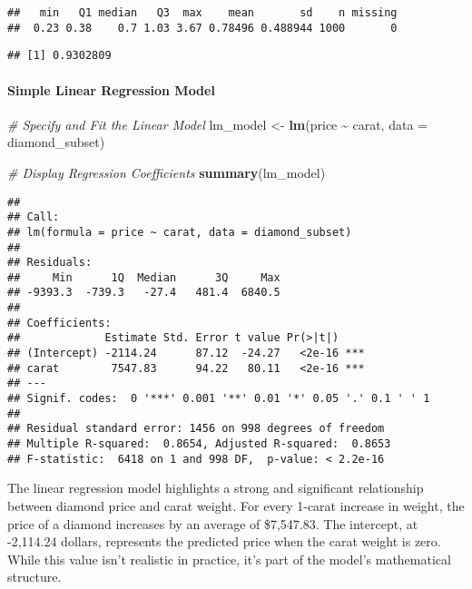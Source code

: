 \documentclass[
]{article}
\newenvironment{Shaded}{\begin{snugshade}}{\end{snugshade}}
\newcommand{\AttributeTok}[1]{\textcolor[rgb]{0.13,0.29,0.53}{#1}}
\newcommand{\CommentTok}[1]{\textcolor[rgb]{0.56,0.35,0.01}{\textit{#1}}}
\newcommand{\FunctionTok}[1]{\textcolor[rgb]{0.13,0.29,0.53}{\textbf{#1}}}
\newcommand{\NormalTok}[1]{#1}
\newcommand{\OtherTok}[1]{\textcolor[rgb]{0.56,0.35,0.01}{#1}}
\newcommand{\SpecialCharTok}[1]{\textcolor[rgb]{0.81,0.36,0.00}{\textbf{#1}}}
\begin{document}
\begin{verbatim}
##   min   Q1 median   Q3  max    mean       sd    n missing
##  0.23 0.38    0.7 1.03 3.67 0.78496 0.488944 1000       0
\end{verbatim}

\begin{Shaded}
\end{Shaded}

\begin{verbatim}
## [1] 0.9302809
\end{verbatim}

\paragraph{Simple Linear Regression
Model}\label{simple-linear-regression-model}

\begin{Shaded}
\begin{Highlighting}[]
\CommentTok{\# Specify and Fit the Linear Model}
\NormalTok{lm\_model }\OtherTok{\textless{}{-}} \FunctionTok{lm}\NormalTok{(price }\SpecialCharTok{\textasciitilde{}}\NormalTok{ carat, }\AttributeTok{data =}\NormalTok{ diamond\_subset)}

\CommentTok{\# Display Regression Coefficients}
\FunctionTok{summary}\NormalTok{(lm\_model)}
\end{Highlighting}
\end{Shaded}

\begin{verbatim}
## 
## Call:
## lm(formula = price ~ carat, data = diamond_subset)
## 
## Residuals:
##     Min      1Q  Median      3Q     Max 
## -9393.3  -739.3   -27.4   481.4  6840.5 
## 
## Coefficients:
##             Estimate Std. Error t value Pr(>|t|)    
## (Intercept) -2114.24      87.12  -24.27   <2e-16 ***
## carat        7547.83      94.22   80.11   <2e-16 ***
## ---
## Signif. codes:  0 '***' 0.001 '**' 0.01 '*' 0.05 '.' 0.1 ' ' 1
## 
## Residual standard error: 1456 on 998 degrees of freedom
## Multiple R-squared:  0.8654, Adjusted R-squared:  0.8653 
## F-statistic:  6418 on 1 and 998 DF,  p-value: < 2.2e-16
\end{verbatim}

The linear regression model highlights a strong and significant
relationship between diamond price and carat weight. For every 1-carat
increase in weight, the price of a diamond increases by an average of
\$7,547.83. The intercept, at -2,114.24 dollars, represents the
predicted price when the carat weight is zero. While this value isn't
realistic in practice, it's part of the model's mathematical structure.
\end{document}
